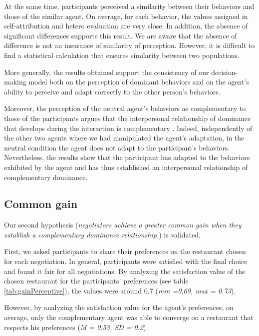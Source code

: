 \documentclass[10pt, a4paper]{article} %
\begin{document}
At the same time, participants perceived a similarity between their behaviors and those of the similar agent. On average, for each behavior, the values assigned in self-attribution and hetero evaluation are very close. In addition, the absence of significant differences supports this result. We are aware that the absence of difference is not an insurance of similarity of perception. However, it is difficult to find a statistical calculation that ensures similarity between two populations.

More generally, the results obtained support the consistency of our decision-making model both on the perception of dominant behaviors and on the agent's ability to perceive and adapt correctly to the other person's behaviors.  

Moreover, the perception of the neutral agent's behaviors as complementary to those of the participants argues that the interpersonal relationship of dominance that develops during the interaction is complementary \cite{burgoonnonverbal}. Indeed, independently of the other two agents where we had manipulated the agent's adaptation, in the neutral condition the agent does not adapt to the participant's behaviors. Nevertheless, the results show that the participant has adapted to the behaviors exhibited by the agent and has thus established an interpersonal relationship of complementary dominance.

\subsection{Common gain}
Our second hypothesis (\textit{negotiators achieve a greater common gain when they establish a complementary dominance relationship.}) is validated. 

First, we asked participants to share their preferences on the restaurant chosen for each negotiation.
In general, participants were satisfied with the final choice and found it fair for all negotiations. 
By analyzing the satisfaction value of the chosen restaurant for the participants' preferences (see table \ref{tab:gainPerceptive}), the values were around 0.7 (\emph{min =0.69, max = 0.73}). 

However, by analyzing the satisfaction value for the agent's preferences, on average, only the complementary agent was able to converge on a restaurant that respects his preferences (\emph{M = 0.53, SD = 0.2}). 
\end{document}
